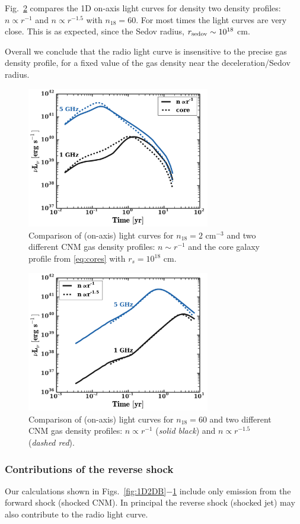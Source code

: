 \documentclass[usenatbib,fleqn]{mnras}
\begin{document}
Fig.~\ref{fig:profs2} compares the 1D on-axis light curves for
density two density profiles: $n\propto r^{-1}$ and $n\propto r^{-1.5}$
with $n_{18}=60$. For most times the light curves are very close.
This is as expected, since the Sedov radius, $r_{\rm sedov}\sim
10^{18}$ cm. 

Overall we conclude that the radio light curve is insensitive to the
precise gas density profile, for a fixed value of the gas density near
the deceleration/Sedov radius.

\begin{figure} 
  \includegraphics[width=8cm]{fig_cores.pdf}
  \caption{\label{fig:cores} Comparison of (on-axis) light curves for
    $n_{18}=2$ cm$^{-3}$ and two different CNM gas density profiles: $n\sim
    r^{-1}$ and the core galaxy profile from \eqref{eq:cores} with
    $r_s=10^{18}$ cm.}
\end{figure}


\begin{figure} 
  \includegraphics[width=8cm]{profs2.pdf}
  \caption{\label{fig:profs2} Comparison of (on-axis) light curves for
    $n_{18}=60$ and two different CNM gas density profiles: $n\propto
    r^{-1}$ ({\it solid black}) and $n\propto r^{-1.5}$ ({\it dashed
      red}).}
\end{figure}

\subsubsection{Contributions of the reverse shock}
Our calculations shown in Figs.~\ref{fig:1D2DB}$-$\ref{fig:cores}
include only emission from the forward shock (shocked CNM).  In
principal the reverse shock (shocked jet) may also contribute to the
radio light curve.
\end{document}
